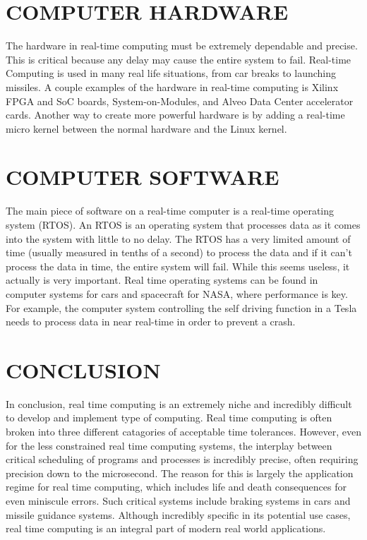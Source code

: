 \documentclass[letterpaper, 10 pt]{IEEEconf}
\begin{document}
\section{COMPUTER HARDWARE}
The hardware in real-time computing must be extremely dependable and precise.
This is critical because any delay may cause the entire system to fail.
Real-time Computing is used in many real life situations, from car breaks to launching missiles. 
A couple examples of the hardware in real-time computing is Xilinx FPGA and
SoC boards, System-on-Modules, and Alveo Data Center accelerator cards.
Another way to create more powerful hardware is by adding a real-time micro kernel 
between the normal hardware and the Linux kernel. 

\section{COMPUTER SOFTWARE}

The main piece of software on a real-time computer is a real-time operating system (RTOS). An RTOS is an operating system
that processes data as it comes into the system with little to no delay. The RTOS has a very limited amount of time (usually
measured in tenths of a second) to process the data and if it can't process the data in time, the entire system will fail. While this seems useless, it actually
is very important. Real time operating systems can be found in computer systems for cars and spacecraft for NASA, where performance
is key. For example, the computer system controlling the self driving function in a Tesla needs to process data in near real-time
in order to prevent a crash.

\section{CONCLUSION}
In conclusion, real time computing is an extremely niche and incredibly difficult to develop and implement
type of computing. Real time computing is often broken into three different catagories of acceptable time
tolerances. However, even for the less constrained real time computing systems, the interplay between
critical scheduling of programs and processes is incredibly precise, often requiring precision down
to the microsecond. The reason for this is largely the application regime for real time computing,
which includes life and death consequences for even miniscule errors. Such critical systems include
braking systems in cars and missile guidance systems. Although incredibly specific in its potential
use cases, real time computing is an integral part of modern real world applications.
\end{document}
